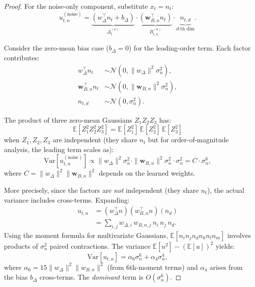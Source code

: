 \documentclass[journal]{IEEEtran}
\begin{document}
\begin{proof}
For the noise-only component, substitute $x_t = n_t$:
\begin{equation}
u_{t,n}^{(\text{noise})} = \underbrace{(w_\Delta^\top n_t + b_\Delta)}_{\Delta_t^{(n)}} \cdot \underbrace{(\mathbf{w}_{B,n}^\top n_t)}_{B_{t,n}^{(n)}} \cdot \underbrace{n_{t,d}}_{d\text{-th dim}}.
\label{eq:noise_only}
\end{equation}

Consider the zero-mean bias case ($b_\Delta = 0$) for the leading-order term.
Each factor contributes:
\begin{align}
w_\Delta^\top n_t &\sim \mathcal{N}(0, \|w_\Delta\|^2 \sigma_n^2), \\
\mathbf{w}_{B,n}^\top n_t &\sim \mathcal{N}(0, \|\mathbf{w}_{B,n}\|^2 \sigma_n^2), \\
n_{t,d} &\sim \mathcal{N}(0, \sigma_n^2).
\end{align}

The product of three zero-mean Gaussians $Z_1 Z_2 Z_3$ has:
\begin{equation}
\mathbb{E}[Z_1^2 Z_2^2 Z_3^2] = \mathbb{E}[Z_1^2]\,\mathbb{E}[Z_2^2]\,\mathbb{E}[Z_3^2]
\end{equation}
when $Z_1, Z_2, Z_3$ are independent (they share $n_t$ but for order-of-magnitude analysis, the leading term scales as):
\begin{equation}
\mathrm{Var}[u_{t,n}^{(\text{noise})}] \propto \|w_\Delta\|^2 \sigma_n^2 \cdot \|\mathbf{w}_{B,n}\|^2 \sigma_n^2 \cdot \sigma_n^2 = C \cdot \sigma_n^6,
\end{equation}
where $C = \|w_\Delta\|^2 \|\mathbf{w}_{B,n}\|^2$ depends on the learned weights.

More precisely, since the factors are \emph{not} independent (they share $n_t$), the actual variance includes cross-terms.
Expanding:
\begin{align}
u_{t,n} &= (w_\Delta^\top n)(w_{B,n}^\top n)(n_d) \nonumber\\
&= \sum_{i,j} w_{\Delta,i}\, w_{B,n,j}\, n_i\, n_j\, n_d.
\label{eq:expanded}
\end{align}
Using the moment formula for multivariate Gaussians, $\mathbb{E}[n_i n_j n_d n_k n_l n_m]$ involves products of $\sigma_n^2$ paired contractions.
The variance $\mathbb{E}[u^2] - (\mathbb{E}[u])^2$ yields:
\begin{equation}
\mathrm{Var}[u_{t,n}] = \alpha_6 \sigma_n^6 + \alpha_4 \sigma_n^4,
\label{eq:var_full}
\end{equation}
where $\alpha_6 = 15\|w_\Delta\|^2\|w_{B,n}\|^2$ (from 6th-moment terms) and $\alpha_4$ arises from the bias $b_\Delta$ cross-terms.
The \emph{dominant} term is $O(\sigma_n^6)$.
\end{proof}
\end{document}
